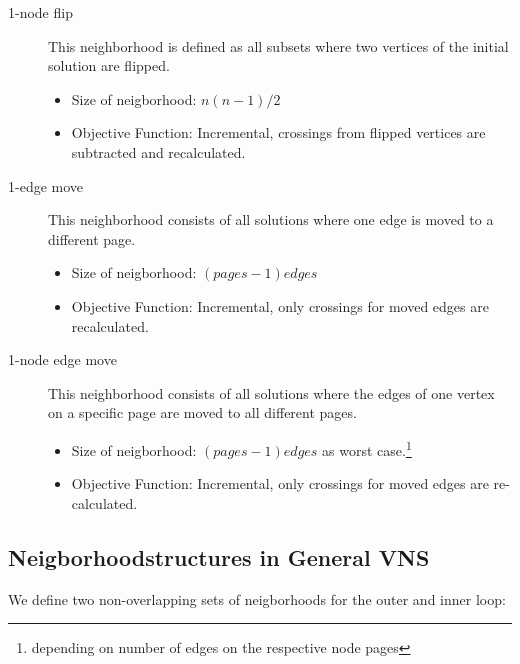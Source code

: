 \documentclass{scrartcl}
\begin{document}
\begin{description}
\item[1-node flip] 
    
    This neighborhood is defined as all subsets where two vertices of the initial solution are flipped.
    \begin{itemize}
        \item Size of neigborhood: $n(n-1)/2$
        \item Objective Function: Incremental, crossings from flipped vertices are subtracted and recalculated.

    \end{itemize}

	
\item[1-edge move] This neighborhood consists of all solutions where one edge is moved to a different page. 
     \begin{itemize}
        \item Size of neigborhood: $(pages-1) edges$ 
        \item Objective Function: Incremental, only crossings for moved edges are recalculated.
    \end{itemize}
   
	
\item[1-node edge move] This neighborhood consists of all solutions where the edges of
	one vertex on a specific page are moved to all different pages. 

    \begin{itemize}
        \item Size of neigborhood: $(pages-1) edges$ as worst
          case.\footnote{depending on number of edges on the respective
            node pages} %
        \item Objective Function: Incremental, only crossings for moved edges are re-calculated.
    \end{itemize}
    

\end{description}



\subsection{Neigborhoodstructures in General VNS}
\label{neighborhood_orders}

We define two non-overlapping sets of neigborhoods for the outer and inner loop:
\end{document}
